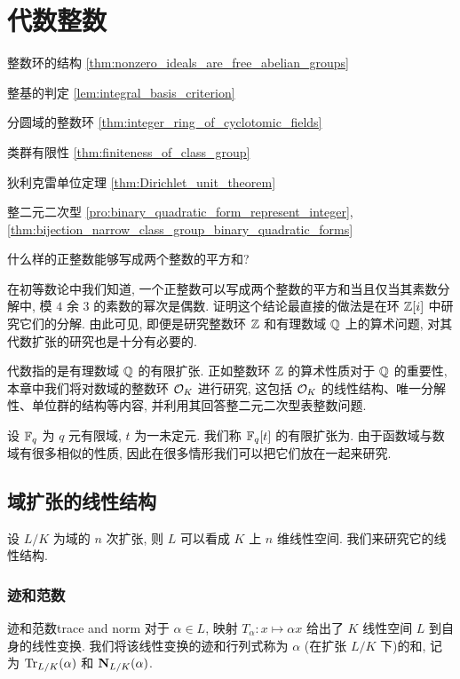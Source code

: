 \chapter{代数整数}
\begin{introduction}
\item 整数环的结构 \ref{thm:nonzero_ideals_are_free_abelian_groups}
\item 整基的判定 \ref{lem:integral_basis_criterion}
\item 分圆域的整数环 \ref{thm:integer_ring_of_cyclotomic_fields}
\item 类群有限性 \ref{thm:finiteness_of_class_group}
\item 狄利克雷单位定理 \ref{thm:Dirichlet_unit_theorem}
\item 整二元二次型 \ref{pro:binary_quadratic_form_represent_integer}, \ref{thm:bijection_narrow_class_group_binary_quadratic_forms}
\end{introduction}

\begin{question*}{}
什么样的正整数能够写成两个整数的平方和?
\end{question*}


在初等数论中我们知道, 一个正整数可以写成两个整数的平方和当且仅当其素数分解中, 模 $4$ 余 $3$ 的素数的幂次是偶数. 证明这个结论最直接的做法是在环 ${\mathbb{Z}}[i]$ 中研究它们的分解. 由此可见, 即便是研究整数环 ${\mathbb{Z}}$ 和有理数域 ${\mathbb{Q}}$ 上的算术问题, 对其代数扩张的研究也是十分有必要的.

代数指的是有理数域 ${\mathbb{Q}}$ 的有限扩张. 正如整数环 ${\mathbb{Z}}$ 的算术性质对于 ${\mathbb{Q}}$ 的重要性, 本章中我们将对数域的整数环 ${\mathcal{O}}_K$ 进行研究, 这包括 ${\mathcal{O}}_K$ 的线性结构、唯一分解性、单位群的结构等内容, 并利用其回答整二元二次型表整数问题.

设 ${\mathbb{F}}_q$ 为 $q$ 元有限域, $t$ 为一未定元. 我们称 ${\mathbb{F}}_q[t]$ 的有限扩张为.
由于函数域与数域有很多相似的性质, 因此在很多情形我们可以把它们放在一起来研究.

\section{域扩张的线性结构}
设 $L/K$ 为域的 $n$ 次扩张, 则 $L$ 可以看成 $K$ 上 $n$ 维线性空间. 我们来研究它的线性结构.

\subsection{迹和范数}

\begin{definition}{迹和范数}{trace and norm}
对于 $\alpha\in L$, 映射 $T_\alpha:x\mapsto \alpha x$ 给出了 $K$ 线性空间 $L$ 到自身的线性变换. 我们将该线性变换的迹和行列式称为 $\alpha$ (在扩张 $L/K$ 下)的和, 记为 ${\mathrm{Tr}}_{L/K}(\alpha)$ 和 ${\mathbf{N}}_{L/K}(\alpha)$.
\end{definition}

